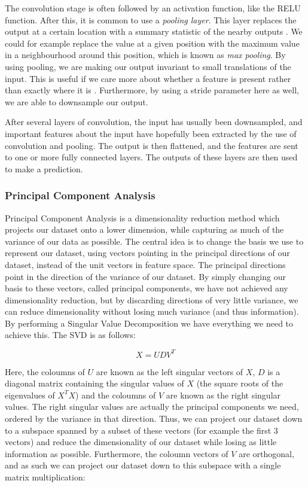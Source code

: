 \documentclass[onecolumn,10pt,cleanfoot]{asme2ej}
\begin{document}
The convolution stage is often followed by an activation function, like the RELU function. After this, it is common to use a {\it pooling layer}. This layer replaces the output at a certain location with a summary statistic of the nearby outputs \cite[335]{gbc}. We could for example replace the value at a given position with the maximum value in a neighbourhood around this position, which is known as {\it max pooling}. By using pooling, we are making our output invariant to small translations of the input. This is useful if we care more about whether a feature is present rather than exactly where it is \cite[336]{gbc}. Furthermore, by using a stride parameter here as well, we are able to downsample our output.

After several layers of convolution, the input has usually been downsampled, and important features about the input have hopefully been extracted by the use of convolution and pooling. The output is then flattened, and the features are sent to one or more fully connected layers. The outputs of these layers are then used to make a prediction.


\subsubsection{Principal Component Analysis}

Principal Component Analysis is a dimensionality reduction method which projects our dataset onto a lower dimension, while capturing as much of the variance of our data as possible. The central idea is to change the basis we use to represent our dataset, using vectors pointing in the principal directions of our dataset, instead of the unit vectors in feature space. The principal directions point in the direction of the variance of our dataset. By simply changing our basis to these vectors, called principal components, we have not achieved any dimensionality reduction, but by discarding directions of very little variance, we can reduce dimensionality without losing much variance (and thus information). By performing a Singular Value Decomposition we have everything we need to achieve this. The SVD is as follows:

\begin{equation}
X = UDV^T
\end{equation}

Here, the coloumns of $U$ are known as the left singular vectors of $X$, $D$ is a diagonal matrix containing the singular values of $X$ (the square roots of the eigenvalues of $X^TX$) and the coloumns of $V$ are known as the right singular values. The right singular values are actually the principal components we need, ordered by the variance in that direction. Thus, we can project our dataset down to a subspace spanned by a subset of these vectors (for example the first 3 vectors) and reduce the dimensionality of our dataset while losing as little information as possible. Furthermore, the coloumn vectors of $V$ are orthogonal, and as such we can project our dataset down to this subspace with a single matrix multiplication:
\end{document}
